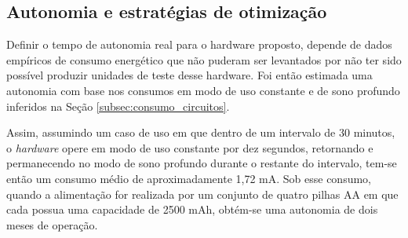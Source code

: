 	\begin{table}[!h]
	\captionsetup{width=9cm}%
    \end{table}
    
    
    
    
    

\subsection{Autonomia e estratégias de otimização}


Definir o tempo de autonomia real para o hardware proposto, depende de dados empíricos de consumo energético que não puderam ser levantados por não ter sido possível produzir unidades de teste desse hardware. Foi então estimada uma autonomia com base nos consumos em modo de uso constante e de sono profundo inferidos na Seção \ref{subsec:consumo_circuitos}. 

Assim, assumindo um caso de uso em que dentro de um intervalo de 30 minutos, o \textit{hardware} opere em modo de uso constante por dez segundos, retornando e permanecendo no modo de sono profundo durante o restante do intervalo, tem-se então um consumo médio de aproximadamente 1,72 mA. Sob esse consumo, quando a alimentação for realizada por um conjunto de quatro pilhas AA em que cada possua uma capacidade de 2500 mAh, obtém-se uma autonomia de dois meses de operação.



